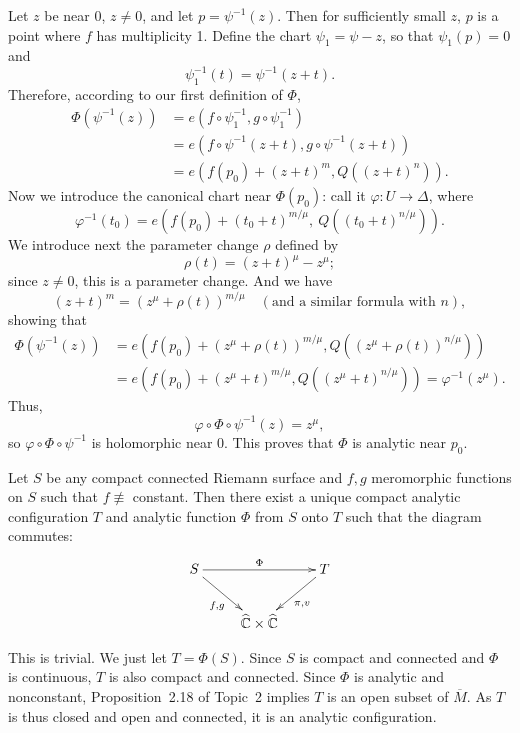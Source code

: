 \documentclass[a4paper,11pt]{article}
\begin{document}
\begin{myproof}
  Let $z$ be near 0, $z \ne 0$, and let $p = \psi^{-1}(z)$.  Then for
  sufficiently small $z$, $p$ is a point where $f$ has multiplicity
  1.
  Define the chart $\psi_1 = \psi-z$, so that $\psi_1(p) = 0$ and
  $$
  \psi_1^{-1}(t) = \psi^{-1}(z + t).
  $$
  Therefore, according to our first definition of $\Phi$,
  $$
  \begin{aligned}
    \Phi(\psi^{-1}(z)) 
    &= e(f \circ \psi_1^{-1}, g\circ \psi_1^{-1})\\
    &= e(f \circ \psi^{-1}(z+t), g\circ \psi^{-1}(z+t))\\
    &= e(f(p_0) + (z+t)^m, Q((z+t)^n)).
  \end{aligned}
  $$
  Now we introduce the canonical chart near $\Phi(p_0)$: call it
  $\varphi : U \to \Delta$, where
  $$
  \varphi^{-1}(t_0) = e(f(p_0) + (t_0 + t)^{m/\mu},\ 
  Q((t_0 + t)^{n/\mu})).
  $$
  We introduce next the parameter change $\rho$ defined by
  $$
  \rho(t) = (z+t)^\mu - z^\mu;
  $$
  since $z \ne 0$, this is a parameter change.  And we have
  $$
  (z+t)^m = (z^\mu + \rho(t))^{m/\mu}\quad
  (\text{and a similar formula with }n),
  $$
  showing that 
  $$
  \begin{aligned}
  \Phi(\psi^{-1}(z))
  &= e(f(p_0) + (z^\mu + \rho(t))^{m/\mu}, Q((z^\mu +
  \rho(t))^{n/\mu}))\\
  &= e(f(p_0) + (z^\mu + t)^{m/\mu}, Q((z^\mu + t)^{n/\mu}))
  = \varphi^{-1}(z^\mu).
  \end{aligned}
  $$
  Thus,
  $$
  \varphi \circ \Phi \circ \psi^{-1}(z) = z^\mu,
  $$
  so $\varphi \circ \Phi \circ \psi^{-1}$ is holomorphic near 0. This
  proves that $\Phi$ is analytic near $p_0$.
\end{myproof}

\begin{cor}
  Let $S$ be any compact connected Riemann surface and $f,g$
  meromorphic functions on $S$ such that $f \not\equiv$ constant.
  Then there exist a unique compact analytic configuration $T$ and
  analytic function $\Phi$ from $S$ onto $T$ such that the diagram
  commutes:
  $$
  \xymatrix {
    S \ar[rr]^{\Phi} \ar[dr]_{f,g} && T \ar[dl]^{\pi, v}\\
    & \widehat{\CCC} \times \widehat{\CCC}
  }
  $$
\end{cor}

\begin{myproof}
  This is trivial.  We just let $T = \Phi(S)$. Since $S$ is compact
  and connected and $\Phi$ is continuous, $T$ is also compact and
  connected.  Since $\Phi$ is analytic and nonconstant,
  Proposition~2.18 of Topic~2 implies $T$ is an open subset of
  $\overline{M}$.  As $T$ is thus closed and open and connected, it is
  an analytic configuration.
\end{myproof}
\end{document}
